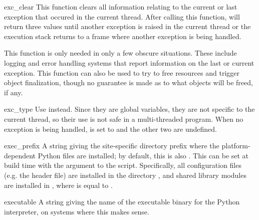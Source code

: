 \begin{funcdesc}{exc_clear}{}
  This function clears all information relating to the current or last
  exception that occured in the current thread.  After calling this
  function,  will return three  values until
  another exception is raised in the current thread or the execution stack
  returns to a frame where another exception is being handled.
  
  This function is only needed in only a few obscure situations.  These
  include logging and error handling systems that report information on the
  last or current exception.  This function can also be used to try to free
  resources and trigger object finalization, though no guarantee is made as
  to what objects will be freed, if any.
\end{funcdesc}

\begin{datadesc}{exc_type}
            {Use  instead.}
  Since they are global variables, they are not specific to the
  current thread, so their use is not safe in a multi-threaded
  program.  When no exception is being handled,  is set
  to  and the other two are undefined.
\end{datadesc}

\begin{datadesc}{exec_prefix}
  A string giving the site-specific directory prefix where the
  platform-dependent Python files are installed; by default, this is
  also .  This can be set at build time with the
   argument to the 
  script.  Specifically, all configuration files (e.g. the
   header file) are installed in the directory
  , and shared
  library modules are installed in , where  is
  equal to .
\end{datadesc}

\begin{datadesc}{executable}
  A string giving the name of the executable binary for the Python
  interpreter, on systems where this makes sense.
\end{datadesc}

